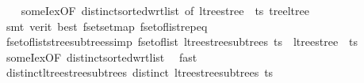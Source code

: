 \begin{isabellebody}
%
\isadelimproof
\ \ %
\endisadelimproof
%
\isatagproof
{}\isamarkupfalse%
\ someI{\isacharunderscore}{\kern0pt}ex{\isacharbrackleft}{\kern0pt}OF\ distinct{\isacharunderscore}{\kern0pt}sorted{\isacharunderscore}{\kern0pt}wrt{\isacharunderscore}{\kern0pt}list{\isacharcomma}{\kern0pt}\ of\ {\isachardoublequoteopen}ltree{\isacharunderscore}{\kern0pt}stree\ {\isacharbar}{\kern0pt}{\isacharbackquote}{\kern0pt}{\isacharbar}{\kern0pt}\ ts{\isachardoublequoteclose}\ tree{\isacharunderscore}{\kern0pt}ltree{\isacharbrackright}{\kern0pt}\isanewline
\ \ \isamarkupfalse%
\ {\isacharparenleft}{\kern0pt}smt\ {\isacharparenleft}{\kern0pt}verit{\isacharcomma}{\kern0pt}\ best{\isacharparenright}{\kern0pt}\ fset{\isachardot}{\kern0pt}set{\isacharunderscore}{\kern0pt}map\ fset{\isacharunderscore}{\kern0pt}of{\isacharunderscore}{\kern0pt}list{\isachardot}{\kern0pt}rep{\isacharunderscore}{\kern0pt}eq{\isacharparenright}{\kern0pt}%
\endisatagproof
{\isafoldproof}%
%
\isadelimproof
\isanewline
%
\endisadelimproof
\isanewline
{}\isamarkupfalse%
\ fset{\isacharunderscore}{\kern0pt}of{\isacharunderscore}{\kern0pt}list{\isacharunderscore}{\kern0pt}stree{\isacharunderscore}{\kern0pt}subtrees{\isacharbrackleft}{\kern0pt}simp{\isacharbrackright}{\kern0pt}{\isacharcolon}{\kern0pt}\ {\isachardoublequoteopen}fset{\isacharunderscore}{\kern0pt}of{\isacharunderscore}{\kern0pt}list\ {\isacharparenleft}{\kern0pt}ltree{\isacharunderscore}{\kern0pt}stree{\isacharunderscore}{\kern0pt}subtrees\ ts{\isacharparenright}{\kern0pt}\ {\isacharequal}{\kern0pt}\ ltree{\isacharunderscore}{\kern0pt}stree\ {\isacharbar}{\kern0pt}{\isacharbackquote}{\kern0pt}{\isacharbar}{\kern0pt}\ ts{\isachardoublequoteclose}\isanewline
%
\isadelimproof
\ \ %
\endisadelimproof
%
\isatagproof
{}\isamarkupfalse%
\ someI{\isacharunderscore}{\kern0pt}ex{\isacharbrackleft}{\kern0pt}OF\ distinct{\isacharunderscore}{\kern0pt}sorted{\isacharunderscore}{\kern0pt}wrt{\isacharunderscore}{\kern0pt}list{\isacharbrackright}{\kern0pt}\ \isamarkupfalse%
\ fast%
\endisatagproof
{\isafoldproof}%
%
\isadelimproof
\isanewline
%
\endisadelimproof
\isanewline
{}\isamarkupfalse%
\ distinct{\isacharunderscore}{\kern0pt}ltree{\isacharunderscore}{\kern0pt}stree{\isacharunderscore}{\kern0pt}subtrees{\isacharcolon}{\kern0pt}\ {\isachardoublequoteopen}distinct\ {\isacharparenleft}{\kern0pt}ltree{\isacharunderscore}{\kern0pt}stree{\isacharunderscore}{\kern0pt}subtrees\ ts{\isacharparenright}{\kern0pt}{\isachardoublequoteclose}\isanewline
%
\isadelimproof
\ \ %

\end{isabellebody}
